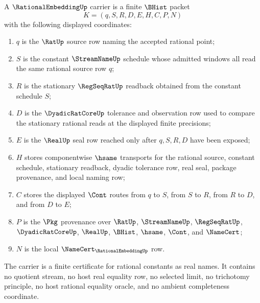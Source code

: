 \begin{definition}
\label{def:rational-embedding-carrier-surface}
A $\RationalEmbeddingUp$ carrier is a finite $\BHist$ packet
$$
K=(q,S,R,D,E,H,C,P,N)
$$
with the following displayed coordinates:
\begin{enumerate}
\item $q$ is the $\RatUp$ source row naming the accepted rational point;
\item $S$ is the constant $\StreamNameUp$ schedule whose admitted windows all read the same rational source row $q$;
\item $R$ is the stationary $\RegSeqRatUp$ readback obtained from the constant schedule $S$;
\item $D$ is the $\DyadicRatCoreUp$ tolerance and observation row used to compare the stationary rational reads at the displayed finite precisions;
\item $E$ is the $\RealUp$ seal row reached only after $q,S,R,D$ have been exposed;
\item $H$ stores componentwise $\hsame$ transports for the rational source, constant schedule, stationary readback, dyadic tolerance row, real seal, package provenance, and local naming row;
\item $C$ stores the displayed $\Cont$ routes from $q$ to $S$, from $S$ to $R$, from $R$ to $D$, and from $D$ to $E$;
\item $P$ is the $\Pkg$ provenance over $\RatUp$, $\StreamNameUp$, $\RegSeqRatUp$, $\DyadicRatCoreUp$, $\RealUp$, $\BHist$, $\hsame$, $\Cont$, and $\NameCert$;
\item $N$ is the local $\NameCert_{\RationalEmbeddingUp}$ row.
\end{enumerate}
The carrier is a finite certificate for rational constants as real names. It contains no quotient stream, no host real equality row, no selected limit, no trichotomy principle, no host rational equality oracle, and no ambient completeness coordinate.
\end{definition}


